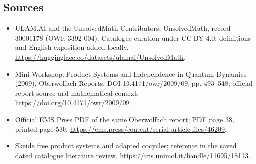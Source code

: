 \documentclass[11pt]{article}
\begin{document}
\subsection{Sources}
\begin{itemize}
\item[\hypertarget{source:30001178:1}{S1}] ULAM.AI and the UnsolvedMath Contributors, UnsolvedMath, record 30001178 (OWR-3392-004). Catalogue curation under CC BY 4.0; definitions and English exposition added locally.
\url{https://huggingface.co/datasets/ulamai/UnsolvedMath}.
\item[\hypertarget{source:30001178:2}{S2}] Mini-Workshop: Product Systems and Independence in Quantum Dynamics (2009), Oberwolfach Reports, DOI 10.4171/owr/2009/09, pp. 493--548; official report source and mathematical context.
\url{https://doi.org/10.4171/owr/2009/09}.
\item[\hypertarget{source:30001178:3}{S3}] Official EMS Press PDF of the same Oberwolfach report; PDF page 38, printed page 530.
\url{https://ems.press/content/serial-article-files/46209}.
\item[\hypertarget{source:30001178:4}{S4}] Skeide free product systems and adapted cocycles; reference in the saved dated catalogue literature review.
\url{https://iris.unimol.it/handle/11695/18113}.
\end{itemize}
\label{end:30001178}
\end{document}

